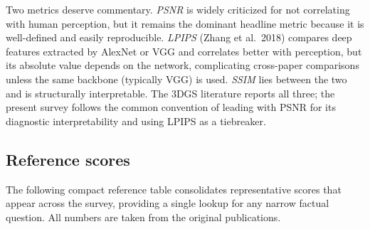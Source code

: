 Two metrics deserve commentary. \emph{PSNR} is widely criticized for not correlating with human perception, but it remains the dominant headline metric because it is well-defined and easily reproducible. \emph{LPIPS} (Zhang et al.~2018) compares deep features extracted by AlexNet or VGG and correlates better with perception, but its absolute value depends on the network, complicating cross-paper comparisons unless the same backbone (typically VGG) is used. \emph{SSIM} lies between the two and is structurally interpretable. The 3DGS literature reports all three; the present survey follows the common convention of leading with PSNR for its diagnostic interpretability and using LPIPS as a tiebreaker.

\subsection{Reference scores}\label{reference-scores}

The following compact reference table consolidates representative scores that appear across the survey, providing a single lookup for any narrow factual question. All numbers are taken from the original publications.


